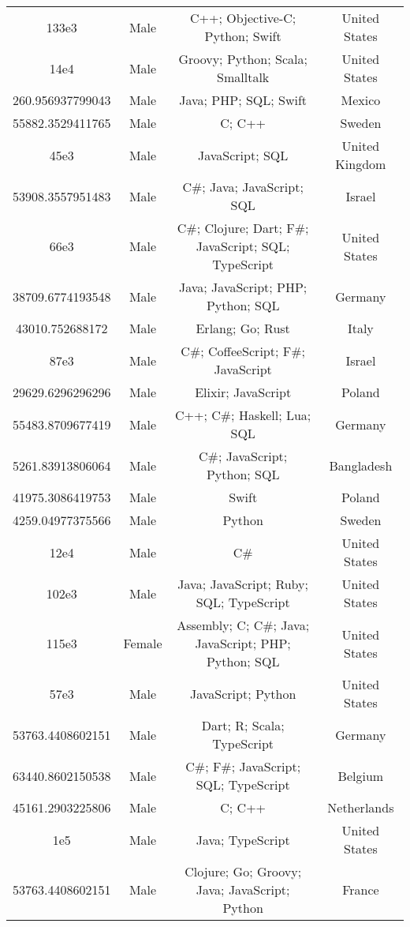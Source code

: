 \begin{center}
\begin{tabular}{ |c|c|c|c| }
133e3  &  Male  &  C++; Objective-C; Python; Swift  &  United States  \\ 
14e4  &  Male  &  Groovy; Python; Scala; Smalltalk  &  United States  \\ 
260.956937799043  &  Male  &  Java; PHP; SQL; Swift  &  Mexico  \\ 
55882.3529411765  &  Male  &  C; C++  &  Sweden  \\ 
45e3  &  Male  &  JavaScript; SQL  &  United Kingdom  \\ 
53908.3557951483  &  Male  &  C\#; Java; JavaScript; SQL  &  Israel  \\ 
66e3  &  Male  &  C\#; Clojure; Dart; F\#; JavaScript; SQL; TypeScript  &  United States  \\ 
38709.6774193548  &  Male  &  Java; JavaScript; PHP; Python; SQL  &  Germany  \\ 
43010.752688172  &  Male  &  Erlang; Go; Rust  &  Italy  \\ 
87e3  &  Male  &  C\#; CoffeeScript; F\#; JavaScript  &  Israel  \\ 
29629.6296296296  &  Male  &  Elixir; JavaScript  &  Poland  \\ 
55483.8709677419  &  Male  &  C++; C\#; Haskell; Lua; SQL  &  Germany  \\ 
5261.83913806064  &  Male  &  C\#; JavaScript; Python; SQL  &  Bangladesh  \\ 
41975.3086419753  &  Male  &  Swift  &  Poland  \\ 
4259.04977375566  &  Male  &  Python  &  Sweden  \\ 
12e4  &  Male  &  C\#  &  United States  \\ 
102e3  &  Male  &  Java; JavaScript; Ruby; SQL; TypeScript  &  United States  \\ 
115e3  &  Female  &  Assembly; C; C\#; Java; JavaScript; PHP; Python; SQL  &  United States  \\ 
57e3  &  Male  &  JavaScript; Python  &  United States  \\ 
53763.4408602151  &  Male  &  Dart; R; Scala; TypeScript  &  Germany  \\ 
63440.8602150538  &  Male  &  C\#; F\#; JavaScript; SQL; TypeScript  &  Belgium  \\ 
45161.2903225806  &  Male  &  C; C++  &  Netherlands  \\ 
1e5  &  Male  &  Java; TypeScript  &  United States  \\ 
53763.4408602151  &  Male  &  Clojure; Go; Groovy; Java; JavaScript; Python  &  France  \\ 

\end{tabular}
\end{center}
